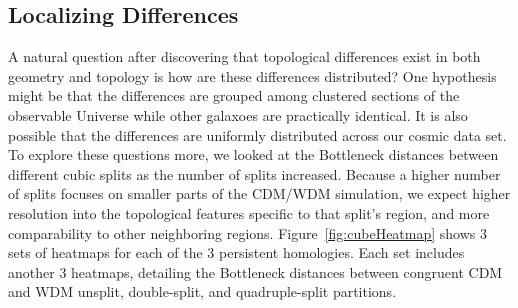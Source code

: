 \documentclass[12pt]{article}
\newcommand{\figref}[1]{Figure~\ref{#1}}
\begin{document}
\subsection{Localizing Differences}
A natural question after discovering that topological differences exist in both geometry and topology is how are these differences distributed? One hypothesis might be that the differences are grouped among clustered sections of the observable Universe while other galaxoes are practically identical. It is also possible that the differences are uniformly distributed across our cosmic data set. To explore these questions more, we looked at the Bottleneck distances between different cubic splits as the number of splits increased. Because a higher number of splits focuses on smaller parts of the CDM/WDM simulation, we expect higher resolution into the topological features specific to that split's region, and more comparability to other neighboring regions. \figref{fig:cubeHeatmap} shows 3 sets of heatmaps for each of the 3 persistent homologies. Each set includes another 3 heatmaps, detailing the Bottleneck distances between congruent CDM and WDM unsplit, double-split, and quadruple-split partitions. 
\end{document}
